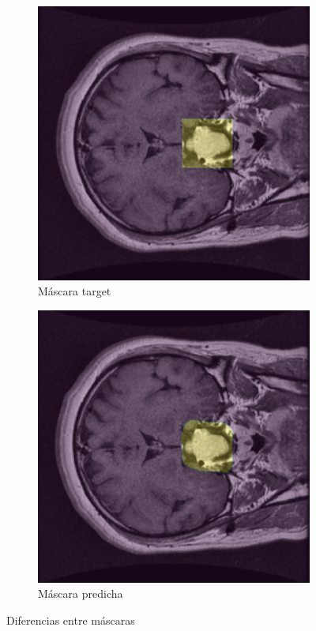 \begin{figure}[H]
    \centering
    \begin{subfigure}[b]{0.4\textwidth}
        \centering
        \includegraphics[width=\textwidth]{chapters/segmentacion/images/mask_train.png}
        \caption{Máscara target}
        \label{fig:imagen1}
    \end{subfigure}
    \hfill
    \begin{subfigure}[b]{0.4\textwidth}
        \centering
        \includegraphics[width=\textwidth]{chapters/segmentacion/images/mask_pred.png}
        \caption{Máscara predicha}
        \label{fig:imagen2}
    \end{subfigure}
    \caption{Diferencias entre máscaras}
    \label{fig.mascaras}
\end{figure}

